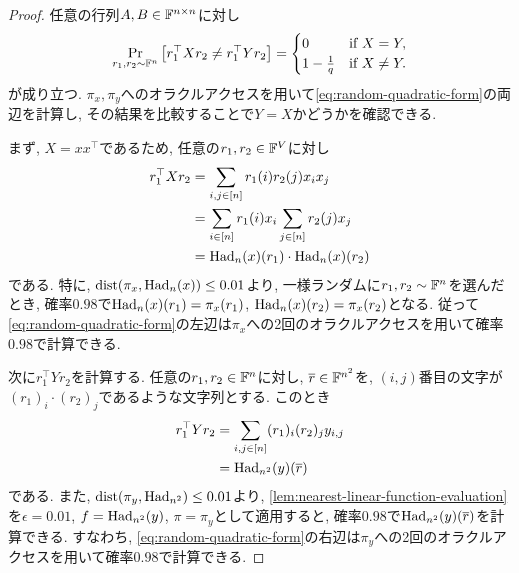   \begin{proof}
  任意の行列$A,B\in\mathbb{F}^{n\times n}$に対し
  \begin{align}
    \Pr_{r_1,r_2\sim\mathbb{F}^n}\qty[ r_1^\top X r_2 \ne r_1^\top Y r_2 ] =
    \begin{cases}
      0 & \text{if } X=Y,\\
      1-\frac{1}{q} & \text{if } X\ne Y.
    \end{cases} \label{eq:random-quadratic-form}
  \end{align}
  が成り立つ.
  $\pi_x,\pi_y$へのオラクルアクセスを用いて\cref{eq:random-quadratic-form}の両辺を計算し, その結果を比較することで$Y=X$かどうかを確認できる.
  
  まず, $X=xx^\top$であるため, 任意の$r_1,r_2\in\mathbb{F}^V$に対し
  \begin{align*}
    r_1^\top X r_2 &= \sum_{i,j\in [n]} r_1(i) r_2(j) x_i x_j \\
    &= \sum_{i\in [n]} r_1(i) x_i \sum_{j\in [n]} r_2(j) x_j \\
    &= \mathrm{Had}_n(x)(r_1)\cdot \mathrm{Had}_n(x)(r_2)
  \end{align*}
  である. 特に, $\mathrm{dist}(\pi_x,\mathrm{Had}_n(x))\le 0.01$より, 一様ランダムに$r_1,r_2\sim\mathbb{F}^n$を選んだとき, 確率$0.98$で$\mathrm{Had}_n(x)(r_1)=\pi_x(r_1)$, $\mathrm{Had}_n(x)(r_2)=\pi_x(r_2)$となる.
  従って\cref{eq:random-quadratic-form}の左辺は$\pi_x$への2回のオラクルアクセスを用いて確率$0.98$で計算できる.

  次に$r_1^\top Y r_2$を計算する. 任意の$r_1,r_2\in\mathbb{F}^n$に対し, $\overline{r}\in\mathbb{F}^{n^2}$を, $(i,j)$番目の文字が$(r_1)_i\cdot (r_2)_j$であるような文字列とする. このとき
  \begin{align*}
    r_1^\top Y r_2 &= \sum_{i,j\in [n]} (r_1)_i (r_2)_j y_{i,j} \\
    &= \mathrm{Had}_{n^2}(y)(\overline{r})
  \end{align*}
  である. また, $\mathrm{dist}(\pi_y,\mathrm{Had}_{n^2})\le 0.01$より, \cref{lem:nearest-linear-function-evaluation}を$\epsilon=0.01$, $f=\mathrm{Had}_{n^2}(y)$, $\pi=\pi_y$として適用すると, 確率$0.98$で$\mathrm{Had}_{n^2}(y)(\overline{r})$を計算できる.
  すなわち, \cref{eq:random-quadratic-form}の右辺は$\pi_y$への2回のオラクルアクセスを用いて確率$0.98$で計算できる.


\end{proof}
